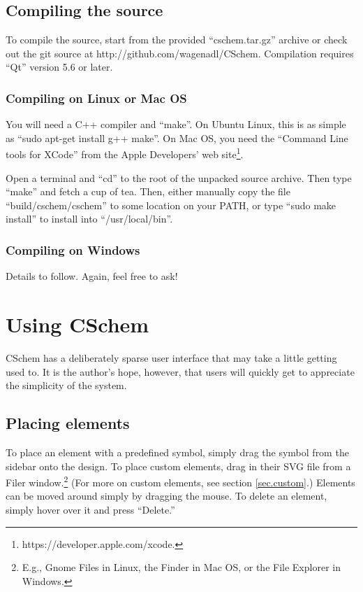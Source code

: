 \documentclass[11pt]{report}
\begin{document}
\section{Compiling the source}
To compile the source,  start from the provided
``cschem.tar.gz'' archive or check out the git source at
http://github.com/wagenadl/CSchem. Compilation requires
``Qt'' version 5.6 or later.

\subsection{Compiling on Linux or Mac OS}

You will need a C++ compiler and ``make''. On Ubuntu Linux, this is as simple
as ``sudo apt-get install g++ make''. On Mac OS, you need the
``Command Line tools for XCode'' from the Apple Developers' web
site\footnote{https://developer.apple.com/xcode.}.

Open a terminal and ``cd'' to the root of the unpacked source
archive. Then type ``make'' and fetch a cup of tea. Then, either
manually copy the file ``build/cschem/cschem'' to some location on your PATH, or type ``sudo make
install'' to install into ``/usr/local/bin''.

\subsection{Compiling on Windows}

Details to follow. Again, feel free to ask!
% 

\chapter{Using CSchem}

CSchem has a deliberately sparse user interface that may take a little
getting used to. It is the author's hope, however, that users will
quickly get to appreciate the simplicity of the system.

\section{Placing elements}

To place an element with a predefined symbol, simply drag the symbol
from the sidebar onto the design. To place custom elements, drag in
their SVG file from a Filer window.\footnote{E.g., Gnome Files in
  Linux, the Finder in Mac OS, or the File Explorer in Windows.} (For
more on custom elements, see section \ref{sec.custom}.) Elements can be moved around simply by dragging the mouse. To
delete an element, simply hover over it and press ``Delete.''
\end{document}
